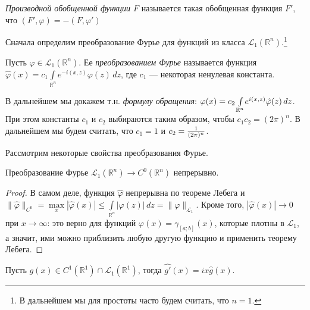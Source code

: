 \documentclass[12pt,titlepage, a4paper]{article}
\begin{document}
\begin{defen}
\emph{Производной обобщенной функции $F$} называется такая
обобщенная функция $F'$, что $(F',\varphi)=-(F,\varphi')$
\end{defen}



Сначала определим преобразование Фурье для функций из класса
$\mathcal{L}_1(\mathbb{R}^n)$.\footnote{В дальнейшем мы для простоты
часто будем считать, что $n=1$.}

\begin{defen}
Пусть $\varphi\in\mathcal{L}_1(\mathbb{R}^n)$. Ее
\emph{преобразованием Фурье} называется функция
$\hat{\varphi}(x)=c_1\int\limits_{\mathbb{R}^n}\!e^{-i(x,z)}\varphi(z)\,dz$,
где $c_1$ --- некоторая ненулевая константа.
\end{defen}

\begin{zam}
В дальнейшем мы докажем т.н. \emph{формулу обращения}:
$\varphi(x)\p=c_2\int\limits_{\mathbb{R}^n}\!e^{i(x,z)}\hat{\varphi}(z)\,dz$.
При этом константы $c_1$ и $c_2$ выбираются таким образом, чтобы
$c_1c_2=(2\pi)^n$. В дальнейшем мы будем считать, что $c_1=1$ и
$c_2\p=\frac{1}{(2\pi)^n}$.
\end{zam}

Рассмотрим некоторые свойства преобразования Фурье.

\begin{theorem}
Преобразование Фурье $\mathcal{L}_1(\mathbb{R}^n)\to
C^0(\mathbb{R}^n)$ непрерывно.
\end{theorem}

\begin{proof}
В самом деле, функция $\hat{\varphi}$ непрерывна по теореме Лебега и
$\|\hat{\varphi}\|_{C^0}=\max\limits_x|\hat{\varphi}(x)|\leqslant\int\limits_
{\mathbb{R}^n}\!|\varphi(z)|\,dz=\|\varphi\|_{\mathcal{L}_1}$. Кроме
того, $|\hat{\varphi}(x)|\to 0$ при $x\to\infty$: это верно для
функций $\varphi(x)=\gamma_{[a;b]}(x)$, которые плотны в
$\mathcal{L}_1$, а значит, ими можно приблизить любую другую функцию
и применить теорему Лебега.
\end{proof}

\begin{theorem}
Пусть $g(x)\in C^1(\mathbb{R}^1)\cap\mathcal{L}_1(\mathbb{R}^1)$,
тогда $\widehat{g'}(x)=ix\hat{g}(x)$.
\end{theorem}
\end{document}
